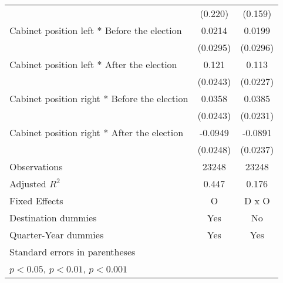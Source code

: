 \begin{table}[htbp]
\begin{tabular}{l*{2}{c}}
                    &     (0.220)         &     (0.159)         \\
[1em]
Cabinet position left * Before the election&      0.0214         &      0.0199         \\
                    &    (0.0295)         &    (0.0296)         \\
[1em]
Cabinet position left * After the election&       0.121\sym{***}&       0.113\sym{***}\\
                    &    (0.0243)         &    (0.0227)         \\
[1em]
Cabinet position right * Before the election&      0.0358         &      0.0385         \\
                    &    (0.0243)         &    (0.0231)         \\
[1em]
Cabinet position right * After the election&     -0.0949\sym{***}&     -0.0891\sym{***}\\
                    &    (0.0248)         &    (0.0237)         \\
\hline
Observations        &       23248         &       23248         \\
Adjusted \(R^{2}\)  &       0.447         &       0.176         \\
Fixed Effects       &           O         &       D x O         \\
Destination dummies &         Yes         &          No         \\
Quarter-Year dummies&         Yes         &         Yes         \\
\hline\hline
\multicolumn{3}{l}{\footnotesize Standard errors in parentheses}\\
\multicolumn{3}{l}{\footnotesize \sym{*} \(p<0.05\), \sym{**} \(p<0.01\), \sym{***} \(p<0.001\)}\\
\end{tabular}
\end{table}
